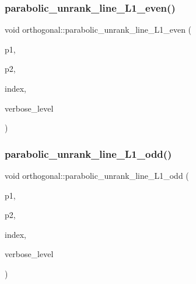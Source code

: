 \subsubsection{\texorpdfstring{parabolic\+\_\+unrank\+\_\+line\+\_\+\+L1\+\_\+even()}{parabolic\_unrank\_line\_L1\_even()}}
{\footnotesize\ttfamily void orthogonal\+::parabolic\+\_\+unrank\+\_\+line\+\_\+\+L1\+\_\+even (\begin{DoxyParamCaption}\item[{\mbox{\hyperlink{galois_8h_a09fddde158a3a20bd2dcadb609de11dc}{I\+NT}} \&}]{p1,  }\item[{\mbox{\hyperlink{galois_8h_a09fddde158a3a20bd2dcadb609de11dc}{I\+NT}} \&}]{p2,  }\item[{\mbox{\hyperlink{galois_8h_a09fddde158a3a20bd2dcadb609de11dc}{I\+NT}}}]{index,  }\item[{\mbox{\hyperlink{galois_8h_a09fddde158a3a20bd2dcadb609de11dc}{I\+NT}}}]{verbose\+\_\+level }\end{DoxyParamCaption})}

\mbox{\label{classorthogonal_af59966fe1bb32196deaafbe6849fdeb1}} 
\subsubsection{\texorpdfstring{parabolic\+\_\+unrank\+\_\+line\+\_\+\+L1\+\_\+odd()}{parabolic\_unrank\_line\_L1\_odd()}}
{\footnotesize\ttfamily void orthogonal\+::parabolic\+\_\+unrank\+\_\+line\+\_\+\+L1\+\_\+odd (\begin{DoxyParamCaption}\item[{\mbox{\hyperlink{galois_8h_a09fddde158a3a20bd2dcadb609de11dc}{I\+NT}} \&}]{p1,  }\item[{\mbox{\hyperlink{galois_8h_a09fddde158a3a20bd2dcadb609de11dc}{I\+NT}} \&}]{p2,  }\item[{\mbox{\hyperlink{galois_8h_a09fddde158a3a20bd2dcadb609de11dc}{I\+NT}}}]{index,  }\item[{\mbox{\hyperlink{galois_8h_a09fddde158a3a20bd2dcadb609de11dc}{I\+NT}}}]{verbose\+\_\+level }\end{DoxyParamCaption})}

\mbox{\label{classorthogonal_a57a7ad0d16ea67c0636c9f179eeed5d1}} 
